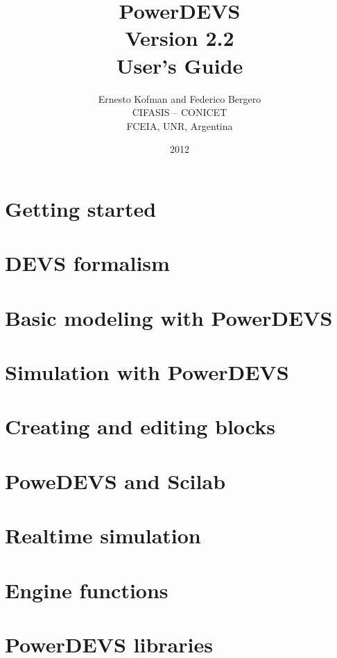\documentclass[a4paper,12pt]{book}
\title{\Huge{\textbf{PowerDEVS}}\\ \vspace{1cm} \large{Version 2.2} \\ \vspace{1cm} \huge{User's Guide}\vspace{2cm}}
\author{ Ernesto Kofman and Federico Bergero\vspace{2cm} \\ CIFASIS -- CONICET\\FCEIA, UNR, Argentina}
\date{2012}
\begin{document}
 \maketitle

 \tableofcontents





\chapter{Getting started}


\chapter{DEVS formalism}

\chapter{Basic modeling with PowerDEVS}

\chapter{Simulation with PowerDEVS}

\chapter{Creating and editing blocks}

\chapter{PoweDEVS and Scilab}

\chapter{Realtime simulation}

\appendix
\chapter{Engine functions}

\chapter{PowerDEVS libraries}
\end{document}
